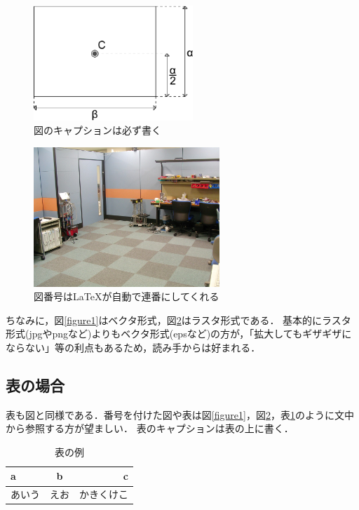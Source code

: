 \documentclass[11pt, a4paper]{jarticle}
\begin{document}
\begin{figure}[b] %
	\begin{center}
	\includegraphics[width=60mm]{figure1.pdf} %
	\caption{図のキャプションは必ず書く} %
	\label{figure0} %
	\end{center}
\end{figure}
\begin{figure}[tb] %
	\begin{center}
	\includegraphics[width=70mm]{figure2.jpg}
	\caption{図番号は\LaTeX が自動で連番にしてくれる}
	\label{figure2}
	\end{center}
\end{figure}
ちなみに，図\ref{figure1}はベクタ形式，図\ref{figure2}はラスタ形式である．
基本的にラスタ形式(jpgやpngなど)よりもベクタ形式(epsなど)の方が，「拡大してもギザギザにならない」等の利点もあるため，読み手からは好まれる．

\pagebreak %

\subsection{表の場合}
表も図と同様である．番号を付けた図や表は図\ref{figure1}，図\ref{figure2}，表\ref{table1}のように文中から参照する方が望ましい．
表のキャプションは表の上に書く．
\begin{table}[tb] %
	\caption{表の例}
	\label{table1}
	\begin{center}
	\begin{tabular}{| l | c | r |}
	\hline
	a & b & c \\ \hline
	あいう & えお & かきくけこ \\ \hline
	\end{tabular}
	\end{center}
\end{table}
\end{document}
